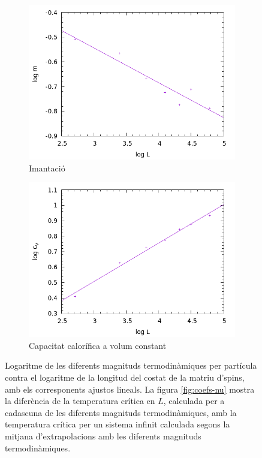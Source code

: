 \documentclass[a4paper]{article}
\begin{document}
\begin{figure}[H]
\begin{subfigure}{.45\textwidth}
        \centering
        \includegraphics[width=\textwidth]{coefs-betanu.png}
        \caption{Imantació}
        \label{fig:coefs-betanu}
    \end{subfigure}
    \begin{subfigure}{.45\textwidth}
        \centering
        \includegraphics[width=\textwidth]{coefs-alphanu.png}
        \caption{Capacitat calorífica a volum constant}
        \label{fig:coefs-alphanu}
    \end{subfigure}
    \caption{Logaritme de les diferents magnituds termodinàmiques per partícula contra el logaritme de la longitud del costat de la matriu d'spins, amb els corresponents ajustos lineals. La figura \ref{fig:coefs-nu} mostra la diferència de la temperatura crítica en $L$, calculada per a cadascuna de les diferents magnituds termodinàmiques, amb la temperatura crítica per un sistema infinit calculada segons la mitjana d'extrapolacions amb les diferents magnituds termodinàmiques.}
\label{fig:coefs}
\end{figure}
\end{document}
